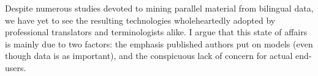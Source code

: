 Despite numerous studies devoted to mining parallel material from bilingual data, we have yet to see the resulting technologies wholeheartedly adopted by professional translators and terminologists alike. I argue that this state of affairs is mainly due to two factors: the emphasis published authors put on models (even though data is as important), and the conspicuous lack of concern for actual end-users.
